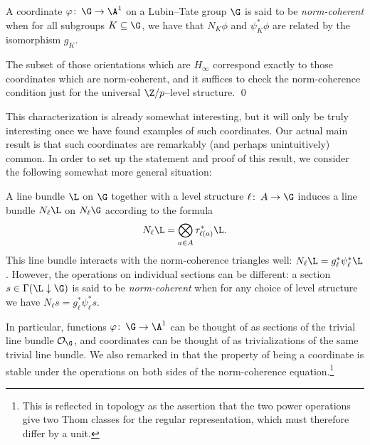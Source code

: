 \begin{definition}\label{NormCoherentDefn}
A coordinate \(\phi\co \G \to \A^1\) on a Lubin--Tate group \(\G\) is said to be \textit{norm-coherent} when for all subgroups \(K \subseteq \G\), we have that \(N_K \phi\) and \(\psi_K^* \phi\) are related by the isomorphism \(g_K\).
\end{definition}

\begin{corollary}
The subset of those orientations which are \(H_\infty\) correspond exactly to those coordinates which are norm-coherent, and it suffices to check the norm-coherence condition just for the universal \(\Z/p\)--level structure. \qed
\end{corollary}

This characterization is already somewhat interesting, but it will only be truly interesting once we have found examples of such coordinates.  Our actual main result is that such coordinates are remarkably (and perhaps unintuitively) common.  In order to set up the statement and proof of this result, we consider the following somewhat more general situation:

\begin{definition}
A line bundle \(\L\) on \(\G\) together with a level structure \(\ell\co A \to \G\) induces a line bundle \(N_\ell \L\) on \(N_\ell \G\) according to the formula \[N_\ell \L = \bigotimes_{a \in A} \tau_{\ell(a)}^* \L.\]  This line bundle interacts with the norm-coherence triangles well: \(N_\ell \L = g_\ell^* \psi_\ell^* \L\).  However, the operations on individual sections can be different: a section \(s \in \Gamma(\L \downarrow \G)\) is said to be \textit{norm-coherent} when for any choice of level structure we have \(N_\ell s = g_\ell^* \psi_\ell^* s\).
\end{definition}

\begin{example}
In particular, functions \(\phi\co \G \to \A^1\) can be thought of as sections of the trivial line bundle \(\sheaf O_{\G}\), and coordinates can be thought of as trivializations of the same trivial line bundle.  We also remarked in  that the property of being a coordinate is stable under the operations on both sides of the norm-coherence equation.\footnote{This is reflected in topology as the assertion that the two power operations give two Thom classes for the regular representation, which must therefore differ by a unit.}
\end{example}

